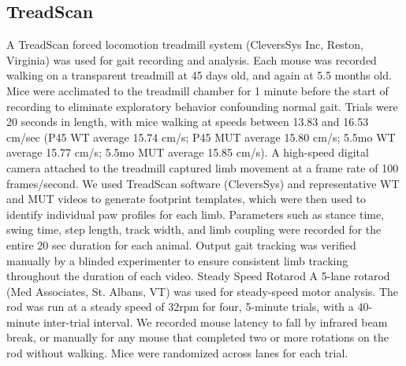 \subsection{TreadScan}
A TreadScan forced locomotion treadmill
system (CleversSys Inc, Reston, Virginia) was used for gait recording and
analysis. Each mouse was recorded walking on a transparent treadmill at 45 days
old, and again at 5.5 months old.  Mice were acclimated to the treadmill chamber
for 1 minute before the start of recording to eliminate exploratory behavior
confounding normal gait. Trials were 20 seconds in length, with mice walking at
speeds between 13.83 and 16.53 cm/sec (P45 WT average 15.74 cm/s; P45 MUT
average 15.80 cm/s; 5.5mo WT average 15.77 cm/s; 5.5mo MUT average 15.85 cm/s).
A high-speed digital camera attached to the treadmill captured limb movement at
a frame rate of 100 frames/second. We used TreadScan software (CleversSys) and
representative WT and MUT videos to generate footprint templates, which were
then used to identify individual paw profiles for each limb. Parameters such as
stance time, swing time, step length, track width, and limb coupling were
recorded for the entire 20 sec duration for each animal. Output gait tracking
was verified manually by a blinded experimenter to ensure consistent limb
tracking throughout the duration of each video.  Steady Speed Rotarod A 5-lane
rotarod (Med Associates, St. Albans, VT) was used for steady-speed motor
analysis. The rod was run at a steady speed of 32rpm for four, 5-minute trials,
with a 40-minute inter-trial interval. We recorded mouse latency to fall by
infrared beam break, or manually for any mouse that completed two or more
rotations on the rod without walking. Mice were randomized across lanes for each
trial.

